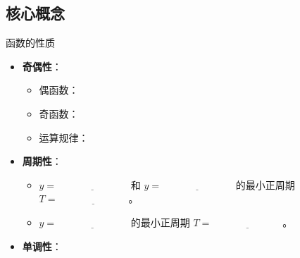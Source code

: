 \documentclass[UTF8, a4paper, 10pt]{ctexart} %
\begin{document}
\subsection{核心概念}
\begin{concept}{函数的性质}
    \begin{itemize}[nosep] %
        \item \textbf{奇偶性}： \underline{\hspace{5cm}}
        \begin{itemize}[nosep]
            \item 偶函数： \underline{\hspace{5cm}}
            \item 奇函数： \underline{\hspace{5cm}}
            \item 运算规律： \underline{\hspace{5cm}}
        \end{itemize}
        \item \textbf{周期性}： \underline{\hspace{5cm}}
        \begin{itemize}[nosep]
            \item $y= \underline{\hspace{3cm}}$ 和 $y= \underline{\hspace{3cm}}$ 的最小正周期 $T = \underline{\hspace{3cm}}$。
            \item $y= \underline{\hspace{3cm}}$ 的最小正周期 $T = \underline{\hspace{3cm}}$。
        \end{itemize}
        \item \textbf{单调性}： \underline{\hspace{5cm}}
    \end{itemize}
\end{concept}
\end{document}
